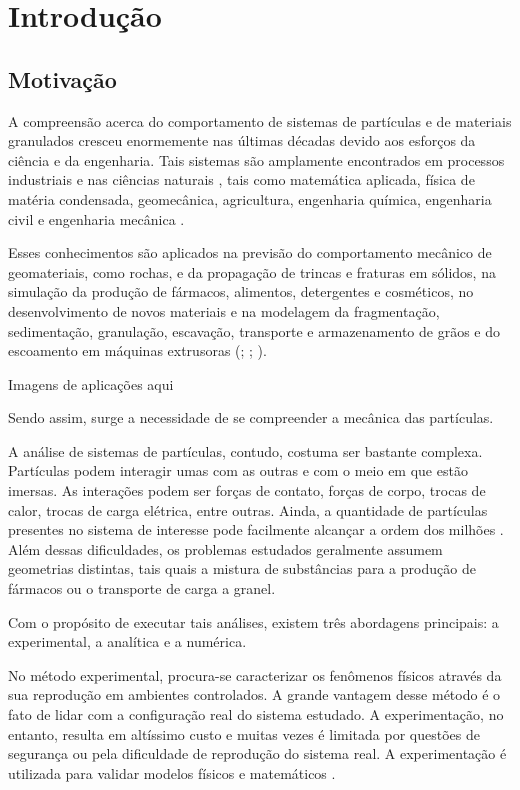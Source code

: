 \chapter[Introdução]{Introdução}

\section{Motivação}

A compreensão acerca do comportamento de sistemas de partículas e de materiais granulados cresceu enormemente nas últimas décadas devido aos esforços da ciência e da engenharia. Tais sistemas são amplamente encontrados em processos industriais e nas ciências naturais , tais como matemática aplicada, física de matéria condensada, geomecânica, agricultura, engenharia química, engenharia civil e engenharia mecânica .

Esses conhecimentos são aplicados na previsão do comportamento mecânico de geomateriais, como rochas, e da propagação de trincas e fraturas em sólidos, na simulação da produção de fármacos, alimentos, detergentes e cosméticos, no desenvolvimento de novos materiais e na modelagem da fragmentação, sedimentação, granulação, escavação, transporte e armazenamento de grãos e do escoamento em máquinas extrusoras (; ; ).

\alert{Imagens de aplicações aqui}

Sendo assim, surge a necessidade de se compreender a mecânica das partículas.

A análise de sistemas de partículas, contudo, costuma ser bastante complexa. Partículas podem interagir umas com as outras e com o meio em que estão imersas. As interações podem ser forças de contato, forças de corpo, trocas de calor, trocas de carga elétrica, entre outras. Ainda, a quantidade de partículas presentes no sistema de interesse pode facilmente alcançar a ordem dos milhões . Além dessas dificuldades, os problemas estudados geralmente assumem geometrias distintas, tais quais a mistura de substâncias para a produção de fármacos ou o transporte de carga a granel.

Com o propósito de executar tais análises, existem três abordagens principais: a experimental, a analítica e a numérica. 

No método experimental, procura-se caracterizar os fenômenos físicos através da sua reprodução em ambientes controlados. A grande vantagem desse método é o fato de lidar com a configuração real do sistema estudado. A experimentação, no entanto, resulta em altíssimo custo e muitas vezes é limitada por questões de segurança ou pela dificuldade de reprodução do sistema real. A experimentação é utilizada para validar modelos físicos e matemáticos .

